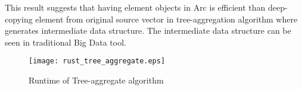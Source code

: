 This result suggests that having element objects in Arc is efficient than deep-copying element from original source vector in tree-aggregation algorithm 
where generates intermediate data structure. The intermediate data structure can be seen in traditional Big Data tool.





\begin{figure}[htb]
    \texttt{[image: rust\_tree\_aggregate.eps]}
    \caption{Runtime of Tree-aggregate algorithm}
    \label{fig:treeagg}
\end{figure}
